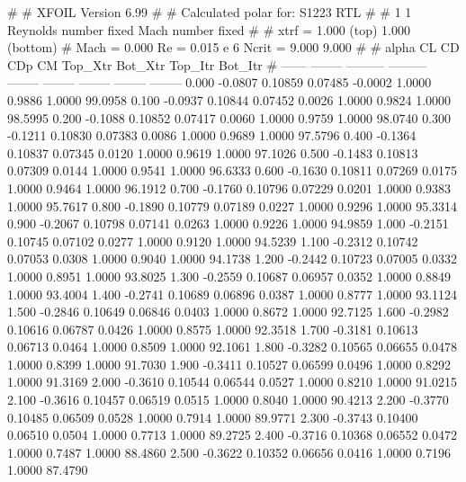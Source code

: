 #  
#       XFOIL         Version 6.99
#  
# Calculated polar for: S1223 RTL                                       
#  
# 1 1 Reynolds number fixed          Mach number fixed         
#  
# xtrf =   1.000 (top)        1.000 (bottom)  
# Mach =   0.000     Re =     0.015 e 6     Ncrit =   9.000  9.000
#  
#   alpha    CL        CD       CDp       CM     Top_Xtr  Bot_Xtr  Top_Itr  Bot_Itr
#  ------ -------- --------- --------- -------- -------- -------- -------- --------
   0.000  -0.0807   0.10859   0.07485  -0.0002   1.0000   0.9886   1.0000  99.0958
   0.100  -0.0937   0.10844   0.07452   0.0026   1.0000   0.9824   1.0000  98.5995
   0.200  -0.1088   0.10852   0.07417   0.0060   1.0000   0.9759   1.0000  98.0740
   0.300  -0.1211   0.10830   0.07383   0.0086   1.0000   0.9689   1.0000  97.5796
   0.400  -0.1364   0.10837   0.07345   0.0120   1.0000   0.9619   1.0000  97.1026
   0.500  -0.1483   0.10813   0.07309   0.0144   1.0000   0.9541   1.0000  96.6333
   0.600  -0.1630   0.10811   0.07269   0.0175   1.0000   0.9464   1.0000  96.1912
   0.700  -0.1760   0.10796   0.07229   0.0201   1.0000   0.9383   1.0000  95.7617
   0.800  -0.1890   0.10779   0.07189   0.0227   1.0000   0.9296   1.0000  95.3314
   0.900  -0.2067   0.10798   0.07141   0.0263   1.0000   0.9226   1.0000  94.9859
   1.000  -0.2151   0.10745   0.07102   0.0277   1.0000   0.9120   1.0000  94.5239
   1.100  -0.2312   0.10742   0.07053   0.0308   1.0000   0.9040   1.0000  94.1738
   1.200  -0.2442   0.10723   0.07005   0.0332   1.0000   0.8951   1.0000  93.8025
   1.300  -0.2559   0.10687   0.06957   0.0352   1.0000   0.8849   1.0000  93.4004
   1.400  -0.2741   0.10689   0.06896   0.0387   1.0000   0.8777   1.0000  93.1124
   1.500  -0.2846   0.10649   0.06846   0.0403   1.0000   0.8672   1.0000  92.7125
   1.600  -0.2982   0.10616   0.06787   0.0426   1.0000   0.8575   1.0000  92.3518
   1.700  -0.3181   0.10613   0.06713   0.0464   1.0000   0.8509   1.0000  92.1061
   1.800  -0.3282   0.10565   0.06655   0.0478   1.0000   0.8399   1.0000  91.7030
   1.900  -0.3411   0.10527   0.06599   0.0496   1.0000   0.8292   1.0000  91.3169
   2.000  -0.3610   0.10544   0.06544   0.0527   1.0000   0.8210   1.0000  91.0215
   2.100  -0.3616   0.10457   0.06519   0.0515   1.0000   0.8040   1.0000  90.4213
   2.200  -0.3770   0.10485   0.06509   0.0528   1.0000   0.7914   1.0000  89.9771
   2.300  -0.3743   0.10400   0.06510   0.0504   1.0000   0.7713   1.0000  89.2725
   2.400  -0.3716   0.10368   0.06552   0.0472   1.0000   0.7487   1.0000  88.4860
   2.500  -0.3622   0.10352   0.06656   0.0416   1.0000   0.7196   1.0000  87.4790
